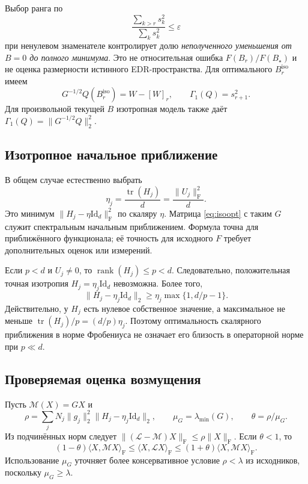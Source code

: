 \documentclass[11pt,a4paper]{article}
\numberwithin{equation}{section}
\theoremstyle{remark}
\newcommand{\Id}{\mathrm{Id}}
\newcommand{\F}{_{\mathrm F}}
\newcommand{\ip}[2]{\langle #1,#2\rangle_{\mathrm F}}
\DeclareMathOperator{\rank}{rank}
\DeclareMathOperator{\tr}{tr}
\begin{document}
Выбор ранга по
\[
 \frac{\sum_{k>r}s_k^2}{\sum_k s_k^2}\le\varepsilon
\]
при ненулевом знаменателе контролирует долю \emph{неполученного уменьшения
от $B=0$ до полного минимума}. Это не относительная ошибка $F(B_r)/F(B_\star)$
и не оценка размерности истинного EDR-пространства.
Для оптимального $B_r^{\mathrm{iso}}$ имеем
\[
 G^{-1/2}Q(B_r^{\mathrm{iso}})=W-[W]_r,
 \qquad \Gamma_1(Q)=s_{r+1}^2.
\]
Для произвольной текущей $B$ изотропная модель также даёт
$\Gamma_1(Q)=\|G^{-1/2}Q\|_2^2$.

\subsection{Изотропное начальное приближение}
В общем случае естественно выбрать
\begin{equation}\label{eq:eta}
 \eta_j=\frac{\tr(H_j)}d=\frac{\|U_j\|\F^2}d.
\end{equation}
Это минимум $\|H_j-\eta\Id_d\|\F^2$ по скаляру $\eta$.
Матрица \eqref{eq:isoopt} с таким $G$ служит спектральным начальным приближением.
Формула точна для приближённого функционала; её точность для исходного
$F$ требует дополнительных оценок или измерений.

Если $p<d$ и $U_j\ne0$, то $\rank(H_j)\le p<d$.
Следовательно, положительная точная изотропия $H_j=\eta_j\Id_d$ невозможна.
Более того,
\begin{equation}\label{eq:anisofloor}
 \|H_j-\eta_j\Id_d\|_2
 \ge\eta_j\max\{1,d/p-1\}.
\end{equation}
Действительно, у $H_j$ есть нулевое собственное значение, а максимальное
не меньше $\tr(H_j)/p=(d/p)\eta_j$.
Поэтому оптимальность скалярного приближения в норме Фробениуса не означает
его близость в операторной норме при $p\ll d$.

\subsection{Проверяемая оценка возмущения}\label{sec:perturbation}
Пусть $\mathcal M(X)=GX$ и
\begin{equation}\label{eq:rho}
 \rho=\sum_jN_j\|g_j\|_2^2\|H_j-\eta_j\Id_d\|_2,
 \qquad \mu_G=\lambda_{\min}(G),\qquad\theta=\rho/\mu_G.
\end{equation}
Из подчинённых норм следует
$\|(\mathcal L-\mathcal M)X\|\F\le\rho\|X\|\F$.
Если $\theta<1$, то
\begin{equation}\label{eq:equivalence}
 (1-\theta)\ip{X}{\mathcal M X}
 \le\ip{X}{\mathcal L X}
 \le(1+\theta)\ip{X}{\mathcal M X}.
\end{equation}
Использование $\mu_G$ уточняет более консервативное условие
$\rho<\lambda$ из исходников, поскольку $\mu_G\ge\lambda$.
\end{document}
